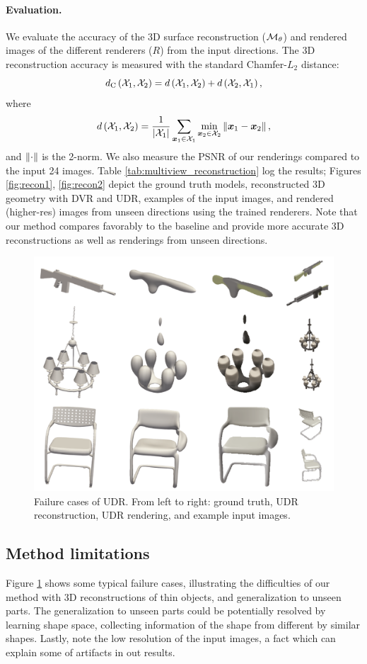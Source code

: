 \documentclass[runningheads]{llncs}
\begin{document}

\paragraph{Evaluation.}
We evaluate the accuracy of the 3D surface reconstruction (${\mathcal{M}}_\theta$) and rendered images of the different renderers ($R$) from the input directions. The 3D reconstruction accuracy is measured with the standard Chamfer-$L_2$ distance: $$
d_{\text{C}}\left({\mathcal{X}}_{1},{\mathcal{X}}_{2} \right) = d\left({\mathcal{X}}_{1},{\mathcal{X}}_{2} \right) + d\left({\mathcal{X}}_{2},{\mathcal{X}}_{1} \right),
$$ where
$$ d\left({\mathcal{X}}_{1},{\mathcal{X}}_{2} \right) = \frac{1}{\left\vert{\mathcal{X}}_1\right\vert}\sum\limits_{{\bm{x}}_{1}\in{\mathcal{X}}_{1}}\min\limits_{{\bm{x}}_2\in {\mathcal{X}}_{2}}\left\Vert{\bm{x}}_1-{\bm{x}}_2\right\Vert,$$ and $\left\Vert\cdot\right\Vert$ is the 2-norm.
%
We also measure the PSNR of our renderings compared to the input 24 images. Table \ref{tab:multiview_reconstruction} log the results; Figures \ref{fig:recon1}, \ref{fig:recon2} depict the ground truth models, reconstructed 3D geometry with DVR and UDR, examples of the input images, and rendered (higher-res) images from unseen directions using the trained renderers. Note that our method compares favorably to the baseline and provide more accurate 3D reconstructions as well as renderings from unseen directions.    

\begin{figure}
     \centering \vspace{-30pt}
     \includegraphics[width=0.4\columnwidth]{failure.png}\vspace{-10pt}
     \caption{Failure cases of UDR. From left to right: ground truth, UDR reconstruction, UDR rendering, and example input images.}
     \label{fig:fail}
\end{figure}


\subsection{Method limitations}
Figure \ref{fig:fail} shows some typical failure cases, illustrating the difficulties of our method with 3D reconstructions of thin objects, and generalization to unseen parts. The generalization to unseen parts could be potentially resolved by learning shape space, collecting information of the shape from different by similar shapes. Lastly, note the low resolution of the input images, a fact which can explain some of artifacts in out results.
\end{document}
